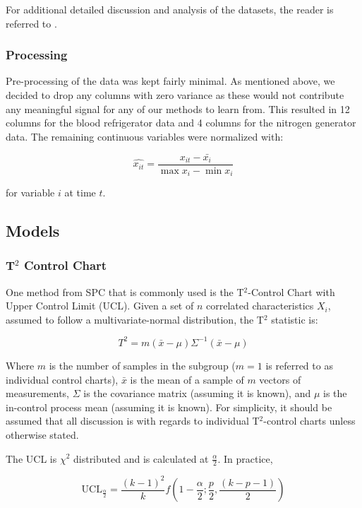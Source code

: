 \documentclass[12pt]{article}
\begin{document}
For additional detailed discussion and analysis of the datasets, the reader is referred to \cite{pinciroli_vago_predicting_2024}.

\subsubsection{Processing}
Pre-processing of the data was kept fairly minimal. As mentioned above, we decided to drop any columns with zero variance as these
would not contribute any meaningful signal for any of our methods to learn from. This resulted in 12 columns for the blood refrigerator data
and 4 columns for the nitrogen generator data. The remaining continuous variables were normalized with:

\begin{equation}
    \hat{x_{it}}=\frac{x_{it}-\bar{x_{i}}}{\max{x_i}-\min{x_i}}
\end{equation}

for variable $i$ at time $t$.


\subsection{Models}
\subsubsection{T$^2$ Control Chart}
One method from SPC that is commonly used is the T$^{2}$-Control Chart with Upper Control Limit (UCL). Given a set of $n$
correlated characteristics $X_i$, assumed to follow a multivariate-normal distribution, the T$^{2}$
statistic is:

\begin{equation}
    T^{2} = m (\bar{x}-\mu)\Sigma^{-1}(\bar{x}-\mu)
\end{equation}

Where $m$ is the number of samples in the subgroup ($m=1$ is referred to as individual control charts),
$\bar{x}$ is the mean of a sample of $m$ vectors of measurements, $\Sigma$ is the covariance matrix (assuming it is known), and
$\mu$ is the in-control process mean (assuming it is known)\cite{lawson_introduction_2021}. For simplicity,
it should be assumed that all discussion is with regards to individual T$^2$-control charts unless otherwise
stated.

The UCL is $\chi^2$ distributed and is calculated at $\frac{\alpha}{2}$. In practice,

\begin{equation}
    \text{UCL}_{\frac{\alpha}{2}} = \frac{(k-1)^2}{k}f \left( 1-\frac{\alpha}{2};\frac{p}{2},\frac{(k-p-1)}{2}\right)
\end{equation}
\end{document}
